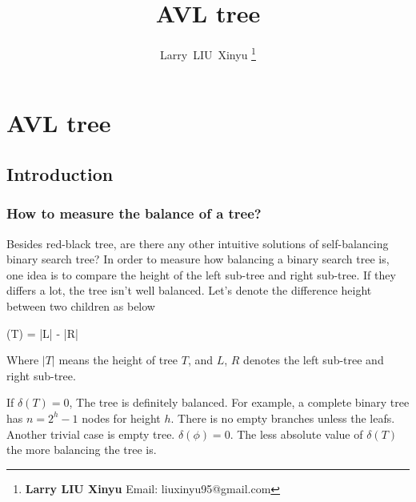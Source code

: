 \documentclass{article}
\begin{document}


\title{AVL tree}

\author{Larry~LIU~Xinyu
\thanks{{\bfseries Larry LIU Xinyu } \newline
  Email: liuxinyu95@gmail.com \newline}
  }

\maketitle
\fi


\ifx\wholebook\relax
\chapter{AVL tree}
\fi

\section{Introduction}
\label{introduction} 

\subsection{How to measure the balance of a tree?}
Besides red-black tree, are there any other intuitive solutions of self-balancing
binary search tree? In order to measure how balancing a binary search tree is,
one idea is to compare the height of the left sub-tree and right sub-tree.
If they differs a lot, the tree isn't well balanced. Let's denote the
difference height between two children as below

\be
  \delta(T) = |L| - |R|
\ee

Where $|T|$ means the height of tree $T$, and $L$, $R$ denotes the left
sub-tree and right sub-tree.

If $\delta(T) = 0$, The tree is definitely balanced. For example, a
complete binary tree has $n=2^h-1$ nodes for height $h$. There is
no empty branches unless the leafs. Another trivial case is empty
tree. $\delta(\phi) = 0$. The less absolute value of $\delta(T)$
the more balancing the tree is.
\end{document}
